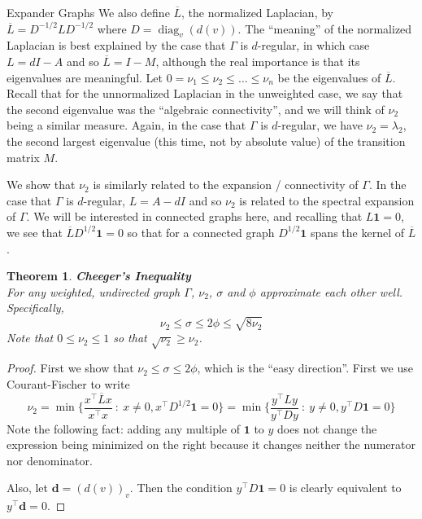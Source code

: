 \documentclass{article}
\DeclareMathOperator{\diag}{diag}
\newtheorem{thm}{Theorem}
\begin{document}
\begin{section}{Expander Graphs}
   We also define $\overline L$, the normalized Laplacian, by $\overline L = D^{-1/2} L D^{-1/2}$ where $D = \diag_v(d(v))$.
   The ``meaning'' of the normalized Laplacian is best explained by the case that $\Gamma$ is $d$-regular, in which case $L = dI - A$ and so $\overline L = I - M$, although the real importance is that its eigenvalues are meaningful.
   Let $0 = \nu_1 \leq \nu_2 \leq \hdots \leq \nu_n$ be the eigenvalues of $\overline L$.
   Recall that for the unnormalized Laplacian in the unweighted case, we say that the second eigenvalue was the ``algebraic connectivity'', and we will think of $\nu_2$ being a similar measure.
   Again, in the case that $\Gamma$ is $d$-regular, we have $\nu_2 = \lambda_2$, the second largest eigenvalue (this time, not by absolute value) of the transition matrix $M$.

   We show that $\nu_2$ is similarly related to the expansion / connectivity of $\Gamma$.
   In the case that $\Gamma$ is $d$-regular, $L = A-dI$ and so $\nu_2$ is related to the spectral expansion of $\Gamma$.
   We will be interested in connected graphs here, and recalling that $L \mathbf 1 = 0$, we see that
   $\overline L D^{1/2} \mathbf 1 = 0$ so that for a connected graph $D^{1/2} \mathbf 1$ spans the kernel of $\overline L$.

   \begin{thm}{\textbf{Cheeger's Inequality}\\}
     For any weighted, undirected graph $\Gamma$, $\nu_2$, $\sigma$ and $\phi$ approximate each other well.
     Specifically,
     $$
     \nu_2 \leq \sigma \leq 2\phi \leq \sqrt{8\nu_2}
     $$
     Note that $0 \leq \nu_2 \leq 1$ so that $\sqrt{\nu_2} \geq \nu_2$.
   \end{thm}
   \begin{proof}
     First we show that $\nu_2 \leq \sigma \leq 2\phi$, which is the ``easy direction''.
     First we use Courant-Fischer to write
     $$
     \nu_2 = \min\bigg\{ \frac{x^\intercal \overline L x}{x^\intercal x} ~:~ x \neq 0, x^\intercal D^{1/2}\mathbf 1 = 0\bigg\} = \min \bigg\{\frac{y^\intercal L y}{y^\intercal D y} ~:~ y \neq 0, y^\intercal D\mathbf 1 = 0\bigg\}
     $$
     Note the following fact: adding any multiple of $\mathbf 1$ to $y$ does not change the expression being minimized on the right because it changes neither the numerator nor denominator.

     Also, let $\mathbf d = (d(v))_v$.
     Then the condition $y^\intercal D \mathbf 1 = 0$ is clearly equivalent to $y^\intercal \mathbf d = 0$.


\end{proof}
\end{section}
\end{document}
